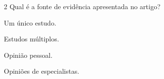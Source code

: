 




\num{2} Qual é a fonte de evidência apresentada no artigo?

\begin{escolha}
\item
  Um único estudo.
\item
  Estudos múltiplos.
\item
  Opinião pessoal.
\item
  Opiniões de especialistas.
\end{escolha}




